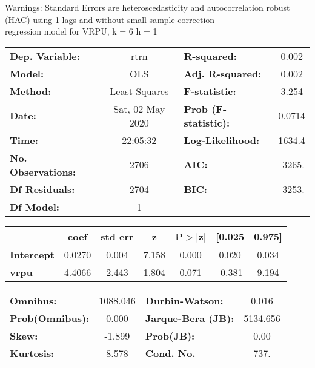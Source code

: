 Warnings: \newline
 [1] Standard Errors are heteroscedasticity and autocorrelation robust (HAC) using 1 lags and without small sample correction\\ 

regression model for VRPU, k = 6 h = 1\begin{center}
\begin{tabular}{lclc}
\toprule
\textbf{Dep. Variable:}    &       rtrn       & \textbf{  R-squared:         } &     0.002   \\
\textbf{Model:}            &       OLS        & \textbf{  Adj. R-squared:    } &     0.002   \\
\textbf{Method:}           &  Least Squares   & \textbf{  F-statistic:       } &     3.254   \\
\textbf{Date:}             & Sat, 02 May 2020 & \textbf{  Prob (F-statistic):} &   0.0714    \\
\textbf{Time:}             &     22:05:32     & \textbf{  Log-Likelihood:    } &    1634.4   \\
\textbf{No. Observations:} &        2706      & \textbf{  AIC:               } &    -3265.   \\
\textbf{Df Residuals:}     &        2704      & \textbf{  BIC:               } &    -3253.   \\
\textbf{Df Model:}         &           1      & \textbf{                     } &             \\
\bottomrule
\end{tabular}
\begin{tabular}{lcccccc}
                   & \textbf{coef} & \textbf{std err} & \textbf{z} & \textbf{P$> |$z$|$} & \textbf{[0.025} & \textbf{0.975]}  \\
\midrule
\textbf{Intercept} &       0.0270  &        0.004     &     7.158  &         0.000        &        0.020    &        0.034     \\
\textbf{vrpu}      &       4.4066  &        2.443     &     1.804  &         0.071        &       -0.381    &        9.194     \\
\bottomrule
\end{tabular}
\begin{tabular}{lclc}
\textbf{Omnibus:}       & 1088.046 & \textbf{  Durbin-Watson:     } &    0.016  \\
\textbf{Prob(Omnibus):} &   0.000  & \textbf{  Jarque-Bera (JB):  } & 5134.656  \\
\textbf{Skew:}          &  -1.899  & \textbf{  Prob(JB):          } &     0.00  \\
\textbf{Kurtosis:}      &   8.578  & \textbf{  Cond. No.          } &     737.  \\
\bottomrule
\end{tabular}
\end{center}

